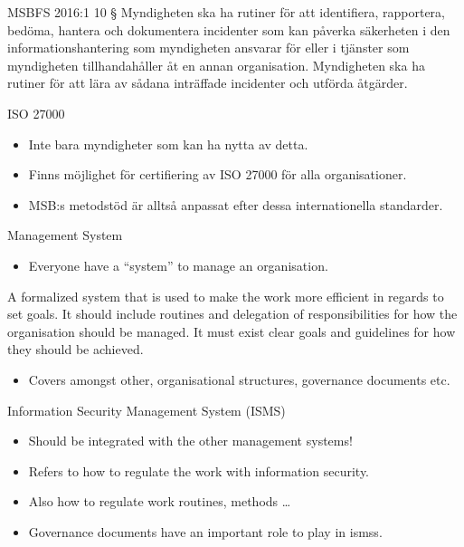 \documentclass{beamer}
\begin{document}
\begin{frame}{MSBFS 2016:1}
  10 § Myndigheten ska ha rutiner för att identifiera, rapportera, bedöma,
  hantera och dokumentera incidenter som kan påverka säkerheten i den
  informationshantering som myndigheten ansvarar för eller i tjänster som
  myndigheten tillhandahåller åt en annan organisation. Myndigheten ska ha
  rutiner för att lära av sådana inträffade incidenter och utförda åtgärder. 
\end{frame}

\begin{frame}{ISO 27000}
  \begin{itemize}
    \item Inte bara myndigheter som kan ha nytta av detta.

    \item Finns möjlighet för certifiering av ISO 27000 för alla 
      organisationer.

    \item MSB:s metodstöd är alltså anpassat efter dessa internationella 
      standarder.

  \end{itemize}
\end{frame}

\begin{frame}{Management System}
  \begin{itemize}
    \item Everyone have a \enquote{system} to manage an organisation.
  \end{itemize}
      A formalized system that is used to make the work more efficient in
      regards to set goals. It should include routines and delegation of
      responsibilities for how the organisation should be managed. It must exist
      clear goals and guidelines for how they should be achieved.
  \begin{itemize}
    \item Covers amongst other, organisational structures, governance documents
      etc.
  \end{itemize}
\end{frame}

\begin{frame}{Information Security Management System (ISMS)}
  \begin{itemize}
    \item Should be integrated with the other management systems!
    \item Refers to how to regulate the work with information security.
    \item Also how to regulate work routines, methods \dots
    \item Governance documents have an important role to play in \acp{isms}\@.
  \end{itemize}
\end{frame}
\end{document}
